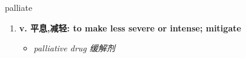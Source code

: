 
\begin{frame}
{\huge palliate}
\begin{center}
\begin{enumerate}\Large
  \item \textbf{v. 平息,减轻: to make less severe or intense; mitigate}
  \begin{itemize}
    \item \em{\Large{palliative drug 缓解剂}}
  \end{itemize}
\end{enumerate}
\end{center}
\end{frame}
